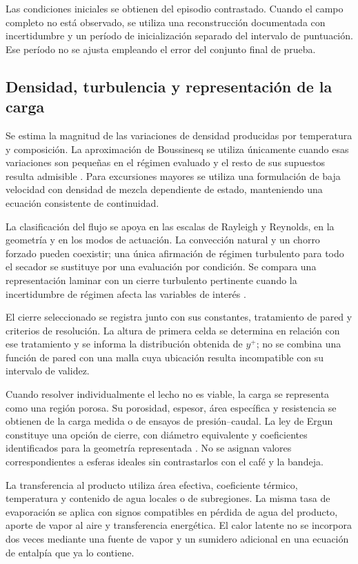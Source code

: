 Las condiciones iniciales se obtienen del episodio contrastado. Cuando el campo completo no está observado, se utiliza una reconstrucción documentada con incertidumbre y un período de inicialización separado del intervalo de puntuación. Ese período no se ajusta empleando el error del conjunto final de prueba.

\subsection{Densidad, turbulencia y representación de la carga}

Se estima la magnitud de las variaciones de densidad producidas por temperatura y composición. La aproximación de Boussinesq se utiliza únicamente cuando esas variaciones son pequeñas en el régimen evaluado y el resto de sus supuestos resulta admisible \cite{gray1976}. Para excursiones mayores se utiliza una formulación de baja velocidad con densidad de mezcla dependiente de estado, manteniendo una ecuación consistente de continuidad.

La clasificación del flujo se apoya en las escalas de Rayleigh y Reynolds, en la geometría y en los modos de actuación. La convección natural y un chorro forzado pueden coexistir; una única afirmación de régimen turbulento para todo el secador se sustituye por una evaluación por condición. Se compara una representación laminar con un cierre turbulento pertinente cuando la incertidumbre de régimen afecta las variables de interés \cite{launder1974,versteeg2007}.

El cierre seleccionado se registra junto con sus constantes, tratamiento de pared y criterios de resolución. La altura de primera celda se determina en relación con ese tratamiento y se informa la distribución obtenida de $y^+$; no se combina una función de pared con una malla cuya ubicación resulta incompatible con su intervalo de validez.

Cuando resolver individualmente el lecho no es viable, la carga se representa como una región porosa. Su porosidad, espesor, área específica y resistencia se obtienen de la carga medida o de ensayos de presión--caudal. La ley de Ergun constituye una opción de cierre, con diámetro equivalente y coeficientes identificados para la geometría representada \cite{ergun1952}. No se asignan valores correspondientes a esferas ideales sin contrastarlos con el café y la bandeja.

La transferencia al producto utiliza área efectiva, coeficiente térmico, temperatura y contenido de agua locales o de subregiones. La misma tasa de evaporación se aplica con signos compatibles en pérdida de agua del producto, aporte de vapor al aire y transferencia energética. El calor latente no se incorpora dos veces mediante una fuente de vapor y un sumidero adicional en una ecuación de entalpía que ya lo contiene.

